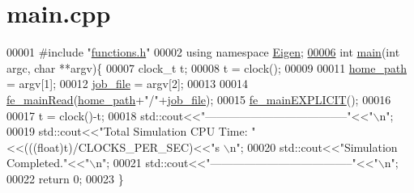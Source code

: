 \hypertarget{main_8cpp_source}{}\section{main.\+cpp}
\label{main_8cpp_source}

\begin{DoxyCode}
00001 \textcolor{preprocessor}{#include "\hyperlink{functions_8h}{functions.h}"}
00002 \textcolor{keyword}{using namespace }\hyperlink{namespace_eigen}{Eigen};
\hyperlink{main_8cpp_a3c04138a5bfe5d72780bb7e82a18e627}{00006} \textcolor{keywordtype}{int} \hyperlink{main_8cpp_a3c04138a5bfe5d72780bb7e82a18e627}{main}(\textcolor{keywordtype}{int} argc, \textcolor{keywordtype}{char} **argv)\{
00007     clock\_t t;
00008     t = clock();
00009     
00011     \hyperlink{_global_variables_8h_a556ce46e457f991c51f3dac111579e2b}{home\_path} = argv[1];
00012     \hyperlink{_global_variables_8h_a5e3d7c3d50f127de0e61daaa407dc7d1}{job\_file} = argv[2];
00013 
00014     \hyperlink{functions_8h_a8a64e915e17f876fe72bedd820e87c33}{fe\_mainRead}(\hyperlink{_global_variables_8h_a556ce46e457f991c51f3dac111579e2b}{home\_path}+\textcolor{stringliteral}{"/"}+\hyperlink{_global_variables_8h_a5e3d7c3d50f127de0e61daaa407dc7d1}{job\_file});
00015     \hyperlink{functions_8h_ab2f8704631ca6c23a453d1905efbb162}{fe\_mainEXPLICIT}();
00016 
00017     t = clock()-t;
00018     std::cout<<\textcolor{stringliteral}{"--------------------------------------"}<<\textcolor{stringliteral}{"\(\backslash\)n"};
00019     std::cout<<\textcolor{stringliteral}{"Total Simulation CPU Time: "}<<(((float)t)/CLOCKS\_PER\_SEC)<<\textcolor{stringliteral}{"s \(\backslash\)n"};
00020     std::cout<<\textcolor{stringliteral}{"Simulation Completed."}<<\textcolor{stringliteral}{"\(\backslash\)n"};
00021     std::cout<<\textcolor{stringliteral}{"--------------------------------------"}<<\textcolor{stringliteral}{"\(\backslash\)n"};
00022     \textcolor{keywordflow}{return} 0;
00023 \}
\end{DoxyCode}
